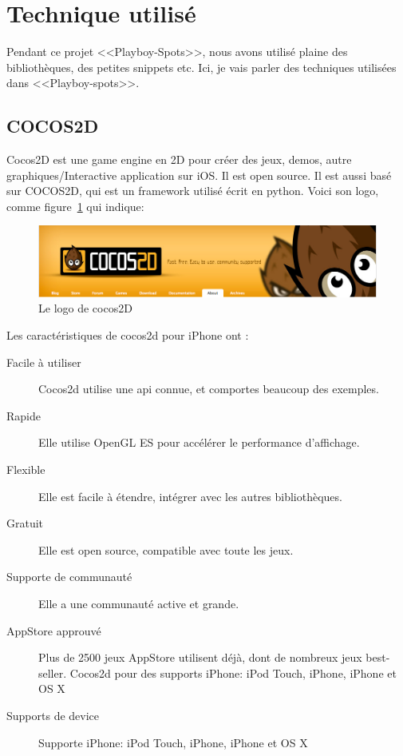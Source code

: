 

\section{Technique utilisé} %
\label{sec:technique_utilisé}

Pendant ce projet <<Playboy-Spots>>, nous avons utilisé plaine des bibliothèques, des petites snippets etc. Ici, je vais parler des techniques utilisées dans <<Playboy-spots>>.

\subsection{COCOS2D} %

Cocos2D est une game engine en 2D pour créer des jeux, demos, autre graphiques/Interactive application sur iOS. Il est open source. Il est aussi basé sur COCOS2D, qui est un framework utilisé écrit en python. Voici son logo, comme figure~\ref{fig:Image_Cocos2d} qui indique:

\begin{figure}[htbp]
	\centering
		\includegraphics[width=6in]{Image/Cocos2d.png}
	\caption{Le logo de cocos2D}
	\label{fig:Image_Cocos2d}
\end{figure}

Les caractéristiques de cocos2d pour iPhone ont :

\begin{description}
	\item[Facile à utiliser] Cocos2d utilise une api connue, et comportes beaucoup des exemples.
	\item[Rapide] Elle utilise OpenGL ES pour accélérer le performance d'affichage.
	\item[Flexible] Elle est facile à étendre, intégrer avec les autres bibliothèques.
	\item[Gratuit] Elle est open source, compatible avec toute les jeux.
	\item[Supporte de communauté] Elle a une communauté active et grande.
	\item[AppStore approuvé]  Plus de 2500 jeux AppStore utilisent déjà, dont de nombreux jeux best-seller.	Cocos2d pour des supports iPhone: iPod Touch, iPhone, iPhone et OS X
	\item[Supports de device] Supporte iPhone: iPod Touch, iPhone, iPhone et OS X
\end{description}

